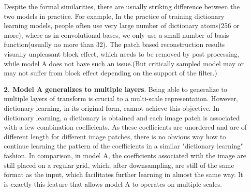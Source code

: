 \documentclass[a4paper]{article}
\begin{document}
Despite the formal similarities, there are usually striking difference between the two models in practice. For example, In the practice of training dictionary learning models, people often use very large number of dictionary atoms(256 or more), where as in convolutional bases, we only use a small number of basis function(usually no more than 32). The patch based reconstruction results visually unpleasant block effect, which needs to be removed by post processing, while model A does not have such an issue.(But critically sampled model may or may not suffer from block effect depending on the support of the filter.)

\textbf{2. Model A generalizes to multiple layers}. Being able to generalize to multiple layers of transform is crucial to a multi-scale representation. However, dictionary learning, in its original form, cannot achieve this objective. In dictionary learning, a dictionary is obtained and each image patch is associated with a few combination coefficients. As these coefficients are unordered and are of different length for different image patches, there is no obvious way how to continue learning the pattern of the coefficients in a similar "dictionary learning" fashion. In comparison, in model A, the coefficients associated with the image are still placed on a regular grid, which, after downsampling, are still of the same format as the input, which facilitates further learning in almost the same way. It is exactly this feature that allows model A to operates on multiple scales. 
\end{document}
